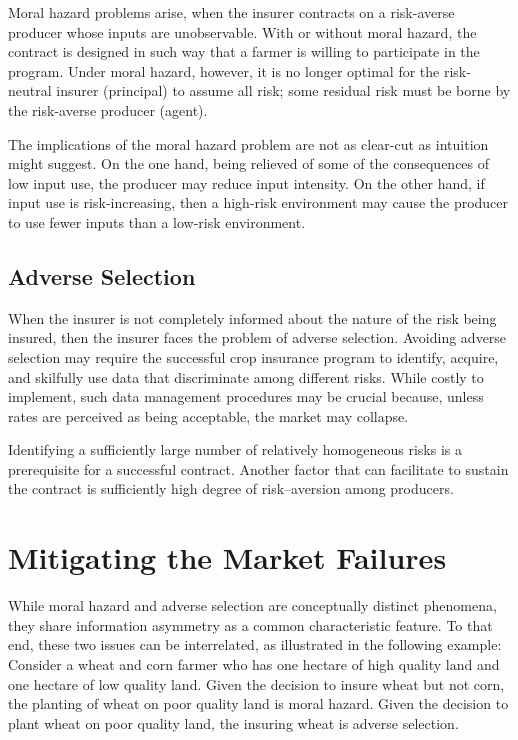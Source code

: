 \documentclass[
]{book}
\begin{document}
Moral hazard problems arise, when the insurer contracts on a risk-averse producer whose inputs are unobservable. With or without moral hazard, the contract is designed in such way that a farmer is willing to participate in the program. Under moral hazard, however, it is no longer optimal for the risk-neutral insurer (principal) to assume all risk; some residual risk must be borne by the risk-averse producer (agent).

The implications of the moral hazard problem are not as clear-cut as intuition might suggest. On the one hand, being relieved of some of the consequences of low input use, the producer may reduce input intensity. On the other hand, if input use is risk-increasing, then a high-risk environment may cause the producer to use fewer inputs than a low-risk environment.

\hypertarget{adverse-selection}{%
\subsection{Adverse Selection}\label{adverse-selection}}

When the insurer is not completely informed about the nature of the risk being insured, then the insurer faces the problem of adverse selection. Avoiding adverse selection may require the successful crop insurance program to identify, acquire, and skilfully use data that discriminate among different risks. While costly to implement, such data management procedures may be crucial because, unless rates are perceived as being acceptable, the market may collapse.

Identifying a sufficiently large number of relatively homogeneous risks is a prerequisite for a successful contract. Another factor that can facilitate to sustain the contract is sufficiently high degree of risk--aversion among producers.

\hypertarget{mitigating-the-market-failures}{%
\section{Mitigating the Market Failures}\label{mitigating-the-market-failures}}

While moral hazard and adverse selection are conceptually distinct phenomena, they share information asymmetry as a common characteristic feature. To that end, these two issues can be interrelated, as illustrated in the following example: Consider a wheat and corn farmer who has one hectare of high quality land and one hectare of low quality land. Given the decision to insure wheat but not corn, the planting of wheat on poor quality land is moral hazard. Given the decision to plant wheat on poor quality land, the insuring wheat is adverse selection.
\end{document}
